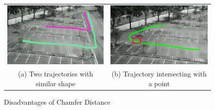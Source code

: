 \begin{figure}[htb!]
  \centering
\begin{tabular}{cc }
 \includegraphics[width=0.45\linewidth]{image/retrievalTwo/chamferDisadv2.png} &
 \includegraphics[width=0.45\linewidth]{image/retrievalTwo/chamferDisadv1.png} \\
 (a) Two trajectories with similar shape &
 (b) Trajectory intersecting with a point \\
\end{tabular}
\caption{Disadvantages of Chamfer Distance} \label{fig:chamferDisadvantage}
\end{figure}




